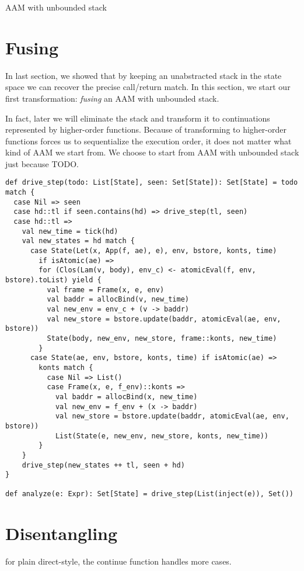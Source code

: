 \documentclass[acmsmall,review,anonymous]{acmart}\settopmatter{printfolios=true,printccs=false,printacmref=false}
\begin{document}
AAM with unbounded stack

\section{Fusing}

In last section, we showed that by keeping an unabstracted stack in the state 
space we can recover the precise call/return match. In this section, we start
our first transformation: \textit{fusing} an AAM with unbounded stack.

In fact, later we will eliminate the stack and transform it to continuations
represented by higher-order functions.
Because of transforming to higher-order functions forces us to sequentialize the execution order,
it does not matter what kind of AAM we start from. 
We choose to start from AAM with unbounded stack just because TODO.

\begin{lstlisting}
def drive_step(todo: List[State], seen: Set[State]): Set[State] = todo match {
  case Nil => seen
  case hd::tl if seen.contains(hd) => drive_step(tl, seen)
  case hd::tl =>
    val new_time = tick(hd)
    val new_states = hd match {
      case State(Let(x, App(f, ae), e), env, bstore, konts, time) 
        if isAtomic(ae) =>
        for (Clos(Lam(v, body), env_c) <- atomicEval(f, env, bstore).toList) yield {
          val frame = Frame(x, e, env)
          val baddr = allocBind(v, new_time)
          val new_env = env_c + (v -> baddr)
          val new_store = bstore.update(baddr, atomicEval(ae, env, bstore))
          State(body, new_env, new_store, frame::konts, new_time)
        }
      case State(ae, env, bstore, konts, time) if isAtomic(ae) =>
        konts match {
          case Nil => List()
          case Frame(x, e, f_env)::konts =>
            val baddr = allocBind(x, new_time)
            val new_env = f_env + (x -> baddr)
            val new_store = bstore.update(baddr, atomicEval(ae, env, bstore))
            List(State(e, new_env, new_store, konts, new_time))
        }
    }
    drive_step(new_states ++ tl, seen + hd)
}

def analyze(e: Expr): Set[State] = drive_step(List(inject(e)), Set())
\end{lstlisting}

\section{Disentangling}

for plain direct-style, the continue function handles more cases.
\end{document}
